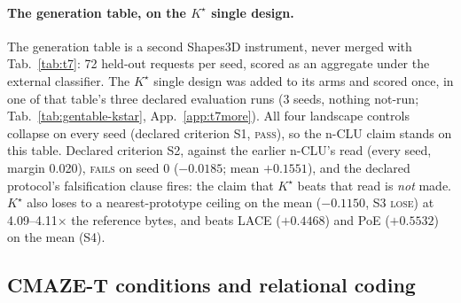 \documentclass{article} %
\newcommand{\Kstar}{\ensuremath{K^{\star}}}
\begin{document}
\paragraph{The generation table, on the $\Kstar$ single design.}
The generation table is a second Shapes3D instrument, never merged with Tab.~\ref{tab:t7}: 72 %
held-out requests per seed, scored as an aggregate under the external classifier. The $\Kstar$ single design was added
to its arms and scored once, in one of that table's three declared evaluation runs (3 seeds,
nothing not-run; Tab.~\ref{tab:gentable-kstar}, %
App.~\ref{app:t7more}). All four landscape controls collapse on every seed (declared criterion S1, %
\textsc{pass}), so the n-CLU claim stands on this table. Declared criterion S2, against the earlier
n-CLU's read (every seed, margin 0.020), \textsc{fails} on seed 0 ($-0.0185$; mean $+0.1551$), and the %
declared protocol's falsification clause fires: the claim that $\Kstar$ beats that read is
\emph{not} made. $\Kstar$ also loses to a nearest-prototype ceiling on the mean %
($-0.1150$, S3 \textsc{lose}) at 4.09--4.11$\times$ the reference bytes, and beats LACE %
($+0.4468$) and PoE ($+0.5532$) on the mean (S4). %

\subsection{CMAZE-T conditions and relational coding}
\label{sec:maze-wm}

\end{document}
